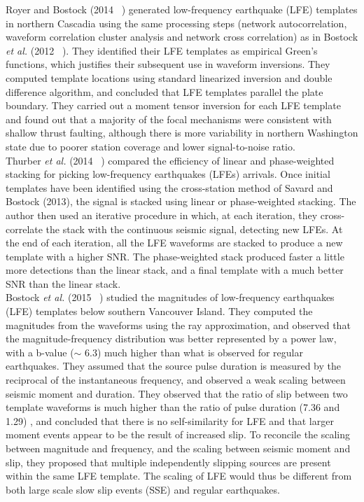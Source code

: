 \documentclass[main.tex]{subfiles}
\begin{document}
Royer and Bostock (2014 ~\cite{ROY_2014}) generated low-frequency earthquake (LFE) templates in northern Cascadia using the same processing steps (network autocorrelation, waveform correlation cluster analysis and network cross correlation) as in Bostock \textit{et al.} (2012 ~\cite{BOS_2012}). They identified their LFE templates as empirical Green's functions, which justifies their subsequent use in waveform inversions. They computed template locations using standard linearized inversion and double difference algorithm, and concluded that LFE templates parallel the plate boundary. They carried out a moment tensor inversion for each LFE template and found out that a majority of the focal mechanisms were consistent with shallow thrust faulting, although there is more variability in northern Washington state due to poorer station coverage and lower signal-to-noise ratio. \\

Thurber \textit{et al.} (2014 ~\cite{THU_2014}) compared the efficiency of linear and phase-weighted stacking for picking low-frequency earthquakes (LFEs) arrivals. Once initial templates have been identified using the cross-station method of Savard and Bostock (2013), the signal is stacked using linear or phase-weighted stacking. The author then used an iterative procedure in which, at each iteration, they cross-correlate the stack with the continuous seismic signal, detecting new LFEs. At the end of each iteration, all the LFE waveforms are stacked to produce a new template with a higher SNR. The phase-weighted stack produced faster a little more detections than the linear stack, and a final template with a much better SNR than the linear stack. \\

Bostock \textit{et al.} (2015 ~\cite{BOS_2015}) studied the magnitudes of low-frequency earthquakes (LFE) templates below southern Vancouver Island. They computed the magnitudes from the waveforms using the ray approximation, and observed that the magnitude-frequency distribution was better represented by a power law, with a b-value ($\sim$ 6.3) much higher than what is observed for regular earthquakes. They assumed that the source pulse duration is measured by the reciprocal of the instantaneous frequency, and observed a weak scaling between seismic moment and duration. They observed that the ratio of slip between two template waveforms is much higher than the ratio of pulse duration (7.36 and 1.29) , and concluded that there is no self-similarity for LFE and that larger moment events appear to be the result of increased slip. To reconcile the scaling between magnitude and frequency, and the scaling between seismic moment and slip, they proposed that multiple independently slipping sources are present within the same LFE template.  The scaling of LFE would thus be different from both large scale slow slip events (SSE) and regular earthquakes. \\
\end{document}
